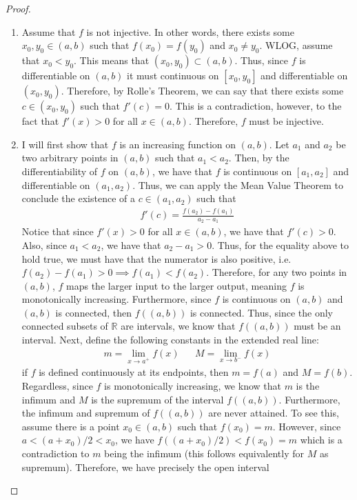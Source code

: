 \documentclass[10pt,a4paper]{article}
\theoremstyle{definition}
\theoremstyle{definition}
\numberwithin{equation}{section}
\begin{document}
\begin{proof}
$ $
\begin{enumerate}[label = (\alph*)]
\item Assume that $f$ is not injective. In other words, there exists some $x_0, y_0 \in (a, b)$ such that $f(x_0) = f(y_0)$ and $x_0 \neq y_0$. WLOG, assume that $x_0 < y_0$. This means that $(x_0, y_0) \subset (a, b)$. Thus, since $f$ is differentiable on $(a, b)$ it must continuous on $[x_0, y_0]$ and differentiable on $(x_0, y_0)$. Therefore, by Rolle's Theorem, we can say that there exists some $c \in (x_0, y_0)$ such that $f'(c) = 0$. This is a contradiction, however, to the fact that $f'(x) > 0$ for all $x \in (a, b)$. Therefore, $f$ must be injective. 
\item I will first show that $f$ is an increasing function on $(a, b)$. Let $a_1$ and $a_2$ be two arbitrary points in $(a, b)$ such that $a_1 < a_2$. Then, by the differentiability of $f$ on $(a, b)$, we have that $f$ is continuous on $[a_1, a_2]$ and differentiable on $(a_1, a_2)$. Thus, we can apply the Mean Value Theorem to conclude the existence of a $c \in (a_1, a_2)$ such that 
\begin{align*}
f'(c) = \frac{f(a_2) - f(a_1)}{a_2 - a_1}
\end{align*}
Notice that since $f'(x) > 0$ for all $x \in (a,b)$, we have that $f'(c) > 0$. Also, since $a_1 < a_2$, we have that $a_2 - a_1 > 0$. Thus, for the equality above to hold true, we must have that the numerator is also positive, i.e. $f(a_2) - f(a_1) > 0 \implies f(a_1) < f(a_2)$. Therefore, for any two points in $(a, b)$, $f$ maps the larger input to the larger output, meaning $f$ is monotonically increasing. Furthermore, since $f$ is continuous on $(a, b)$ and $(a, b)$ is connected, then $f((a, b))$ is connected. Thus, since the only connected subsets of $\mathbb{R}$ are intervals, we know that $f((a, b))$ must be an interval. Next, define the following constants in the extended real line:
\begin{align*}
m = \lim_{x \to a^+} f(x) && M = \lim_{x \to b^-} f(x)
\end{align*}
if $f$ is defined continuously at its endpoints, then $m = f(a)$ and $M = f(b)$. Regardless, since $f$ is monotonically increasing, we know that $m$ is the infimum and $M$ is the supremum of the interval $f((a, b))$. Furthermore, the infimum and supremum of $f((a, b))$ are never attained. To see this, assume there is a point $x_0 \in (a, b)$ such that $f(x_0) = m$. However, since $a < (a + x_0)/2 < x_0$, we have $f((a + x_0)/2) < f(x_0) = m$ which is a contradiction to $m$ being the infimum (this follows equivalently for $M$ as supremum). Therefore, we have precisely the open interval

\end{enumerate}
\end{proof}
\end{document}
